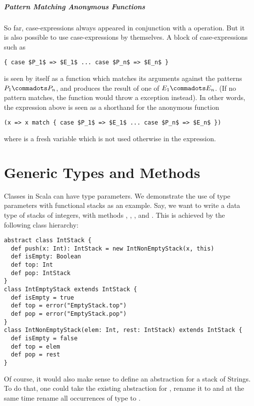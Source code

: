 \paragraph{Pattern Matching Anonymous Functions}

So far, case-expressions always appeared in conjunction with a
\verb@match@ operation. But it is also possible to use
case-expressions by themselves. A block of case-expressions such as
\begin{lstlisting}
{ case $P_1$ => $E_1$ ... case $P_n$ => $E_n$ }
\end{lstlisting}
is seen by itself as a function which matches its arguments
against the patterns $P_1 \commadots P_n$, and produces the result of
one of $E_1 \commadots E_n$. (If no pattern matches, the function
would throw a  exception instead).
In other words, the expression above is seen as a shorthand for the anonymous function
\begin{lstlisting}
(x => x match { case $P_1$ => $E_1$ ... case $P_n$ => $E_n$ })
\end{lstlisting}
where  is a fresh variable which is not used 
otherwise in the expression.

\chapter{Generic Types and Methods}

Classes in Scala can have type parameters. We demonstrate the use of
type parameters with functional stacks as an example. Say, we want to
write a data type of stacks of integers, with methods ,
, , and . This is achieved by the
following class hierarchy:
\begin{lstlisting}
abstract class IntStack {
  def push(x: Int): IntStack = new IntNonEmptyStack(x, this)
  def isEmpty: Boolean
  def top: Int
  def pop: IntStack
}
class IntEmptyStack extends IntStack {
  def isEmpty = true
  def top = error("EmptyStack.top")
  def pop = error("EmptyStack.pop")
}
class IntNonEmptyStack(elem: Int, rest: IntStack) extends IntStack {
  def isEmpty = false
  def top = elem
  def pop = rest
}
\end{lstlisting}
Of course, it would also make sense to define an abstraction for a
stack of Strings. To do that, one could take the existing abstraction
for , rename it to  and at the same
time rename all occurrences of type  to .

